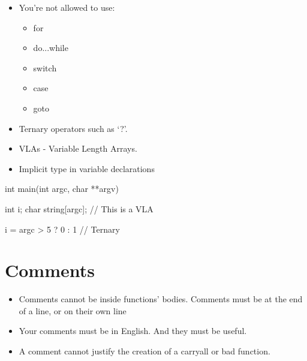 \documentclass{42-en}
\begin{document}
        \begin{itemize}

            \item You're not allowed to use:

                \begin{itemize}

                    \item for
                    \item do...while
                    \item switch
                    \item case
                    \item goto

                \end{itemize}

            \item Ternary operators such as `?'.

            \item VLAs - Variable Length Arrays.

            \item Implicit type in variable declarations

        \end{itemize}
        \begin{42ccode}
    int main(int argc, char **argv)
    {
        int     i;
        char    string[argc]; // This is a VLA

        i = argc > 5 ? 0 : 1 // Ternary
    }
        \end{42ccode}
        \newpage

    \section{Comments}

        \begin{itemize}

            \item Comments cannot be inside functions' bodies.
                Comments must be at the end of a line, or on their own line

            \item Your comments must be in English. And they must be
                useful.

            \item  A comment cannot justify the creation of a carryall or bad function.

        \end{itemize}
\end{document}
